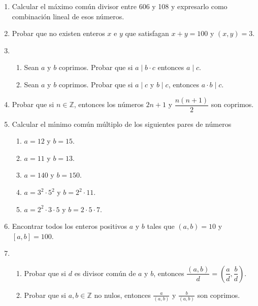 \documentclass[12pt,spanish,makeidx]{amsbook}
\begin{document}
\begin{enumerate}
\smallskip

 \item Calcular el m\'aximo com\'un divisor entre 606 y 108 y
 expresarlo como combinaci\'on lineal de esos n\'umeros.



\smallskip

\item Probar que no existen enteros $x$ e $y$ que satisfagan $x+y=100$ y $(x,y)=3$.

\smallskip

\item %
\begin{enumerate}
 \item Sean $a$ y $b$ coprimos. Probar que si $a\mid b\cdot c$ entonces $a \mid c$.
 \item Sean $a$ y $b$ coprimos. Probar que si $a \mid c$ y $b \mid c$, entonces $a\cdot b \mid c$.

\end{enumerate}



\smallskip

\item Probar que si $n \in {\mathbb Z}$, entonces los n\'umeros $2n+1$ y $\dfrac{n(n+1)}{2}$ son coprimos.

\smallskip


\item Calcular el m\'\i nimo com\'un m\'ultiplo de los siguientes pares de n\'umeros%
\begin{multicols}{3}
\begin{enumerate}
  \item $a=12$ y $b=15$. 
	\item$a=11$ y $b=13$.
	\item $a=140$ y $b=150$.
  \item $a=3^2 \cdot 5^2$ y $b=2^2 \cdot 11$.
	\item $a=2^2 \cdot 3\cdot 5$ y $b=2\cdot 5\cdot 7$.
\end{enumerate}
\end{multicols}
\smallskip


\item Encontrar todos los enteros positivos $a$ y $b$ tales que $(a,b)=10$ y $[a,b]=100$.


\smallskip
\item
\begin{enumerate}
\item Probar que si $d$ es divisor común de $a$ y $b$, entonces $\dfrac{(a,b)}{d} = \left(\dfrac{a}{d}, \dfrac{b}{d}\right)$.
\item Probar que si $a,b\in \mathbb Z$ no nulos, entonces  $\displaystyle \frac a{(a,b)}$ y $\displaystyle \frac b{(a,b)}$ son coprimos.
\end{enumerate}


\end{enumerate}
\end{document}
